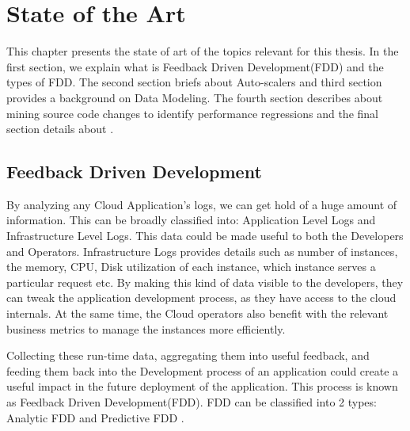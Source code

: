 \documentclass[article,type=msc,colorback,12pt,accentcolor=tud7b]{tudthesis}
\begin{document}

	\cleardoublepage

 \section{State of the Art}
 	
	This chapter presents the state of art of the topics relevant for this thesis. In the first section, we explain what is Feedback Driven Development(FDD) and the types of FDD. The second section briefs about Auto-scalers and third section provides a background on Data Modeling. The fourth section describes about mining source code changes to identify performance regressions and the final section details about . 
	
		\subsection{Feedback Driven Development } 		
		
		By analyzing any Cloud Application's logs, we can get hold of a huge amount of information. This can be broadly classified into: Application Level Logs and Infrastructure Level Logs. This data could be made useful to both the Developers and Operators. Infrastructure Logs provides details such as number of instances, the memory, CPU, Disk utilization of each instance, which instance serves a particular request etc. By making this kind of data visible to the developers, they can tweak the application development process, as they have access to the cloud internals. At the same time, the Cloud operators also benefit with the relevant business metrics to manage the instances more efficiently. 
		
		\par Collecting these run-time data, aggregating them into useful feedback, and feeding them back into the Development process of an application could create a useful impact in the future deployment of the application. This process is known as Feedback Driven Development(FDD). FDD can be classified into 2 types: Analytic FDD and Predictive FDD \cite{cito2015runtime}.
		
\end{document}
